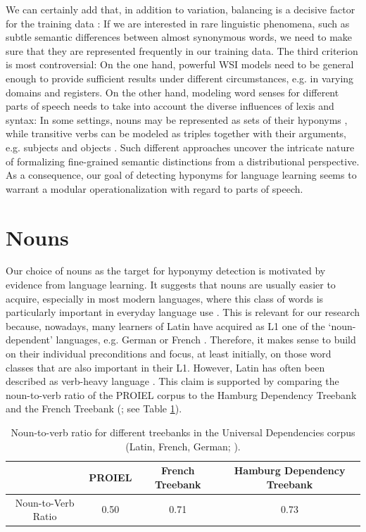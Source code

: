 \documentclass[runningheads]{llncs}
\begin{document}
We can certainly add that, in addition to variation, balancing is a decisive factor for the training data \parencites[620]{liuCombiningIntegratedSampling2011}[9]{weiRoleBalancedTraining2013}[1127]{boneApplyingMachineLearning2015}: If we are interested in rare linguistic phenomena, such as subtle semantic differences between almost synonymous words, we need to make sure that they are represented frequently in our training data. The third criterion is most controversial: On the one hand, powerful \gls{WSI} models need to be general enough to provide sufficient results under different circumstances, e.g. in varying domains and registers. On the other hand, modeling word senses for different parts of speech needs to take into account the diverse influences of lexis and syntax: In some settings, nouns may be represented as sets of their hyponyms \parencite[640]{lewisCompositionalHyponymyPositive2019}, while transitive verbs can be modeled as triples together with their arguments, e.g. subjects and objects \parencite[9]{grefenstetteExperimentalSupportCategorical2011}. Such different approaches uncover the intricate nature of formalizing fine-grained semantic distinctions from a distributional perspective. As a consequence, our goal of detecting hyponyms for language learning seems to warrant a modular operationalization with regard to parts of speech. 

\section{Nouns}
Our choice of nouns as the target for hyponymy detection is motivated by evidence from language learning. It suggests that nouns are usually easier to acquire, especially in most modern languages, where this class of words is particularly important in everyday language use \parencite[9]{garcia-gamezLearningNounsVerbs2019}. This is relevant for our research because, nowadays, many learners of Latin have acquired as L1 one of the `noun-dependent' languages, e.g. German or French \parencite[51-52]{baidakKeyDataTeaching2017}. Therefore, it makes sense to build on their individual preconditions and focus, at least initially, on those word classes that are also important in their L1. However, Latin has often been described as verb-heavy language \parencite[41]{mengeLehrbuchLateinischenSyntax2009}. This claim is supported by comparing the noun-to-verb ratio \parencite[300]{stollNounsVerbsChintang2012} of the PROIEL corpus to the Hamburg Dependency Treebank \parencite{borgesvolkerHDTUDVeryLarge2019} and the French Treebank (\cite{seddahCheatingParserDeath2018}; see Table \ref{tableNounToVerbRatio}).
\begin{table}[ht]
	\begin{tabular}{ c | c | c | c }
  		 & PROIEL & French Treebank & Hamburg Dependency Treebank \\ \hline
  		Noun-to-Verb Ratio & 0.50 & 0.71 & 0.73 \\
	\end{tabular}
	\caption{Noun-to-verb ratio for different treebanks in the Universal Dependencies corpus (Latin, French, German; \cite{nivreUniversalDependenciesV12016}).}
	\label{tableNounToVerbRatio}
\end{table}
\end{document}
